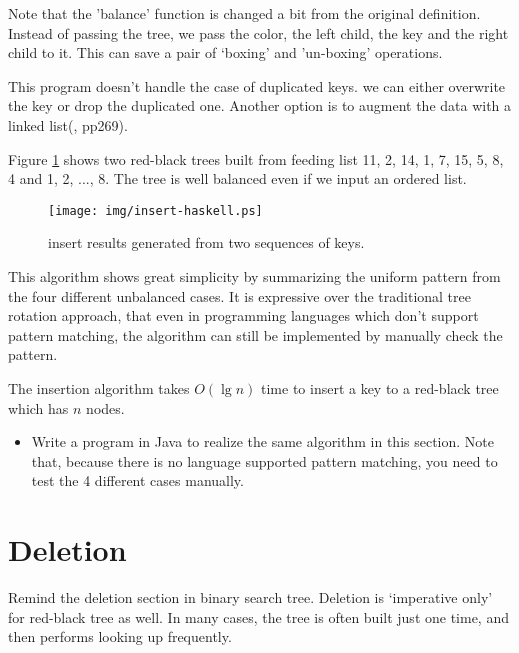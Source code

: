 \documentclass{article}
\begin{document}
Note that the 'balance' function is changed a bit from the original
definition. Instead of passing the tree, we pass
the color, the left child, the key and the right child to it.
This can save a pair of `boxing' and 'un-boxing' operations.

This program doesn't handle the case of duplicated keys. we can
either overwrite the key or drop the duplicated one.
Another option is to augment the data with a linked list(\cite{CLRS}, pp269).

Figure \ref{fig:insert-example} shows two red-black trees
built from feeding list 11, 2, 14, 1, 7, 15, 5, 8, 4 and 1, 2, ..., 8. The tree is well balanced even if we input an ordered list.

\begin{figure}[htbp]
  \centering
  \texttt{[image: img/insert-haskell.ps]}
  \caption{insert results generated from two sequences of keys.} \label{fig:insert-example}
\end{figure}

This algorithm shows great simplicity by summarizing the uniform pattern
from the four different unbalanced cases. It is expressive over
the traditional tree rotation approach, that even in programming languages
which don't support pattern matching, the algorithm can still be
implemented by manually check the pattern.

The insertion algorithm takes $O(\lg n)$ time to insert a key to
a red-black tree which has $n$ nodes.

\begin{Exercise}

\begin{itemize}
\item Write a program in Java to realize the same algorithm in this
section. Note that, because there is no language supported
pattern matching, you need to test the 4 different cases
manually.
\end{itemize}

\end{Exercise}


\section{Deletion}

Remind the deletion section in binary search tree. Deletion is
`imperative only' for red-black tree as well. In many cases,
the tree is often built just one time, and then
performs looking up frequently\cite{okasaki-blog}.
\end{document}
